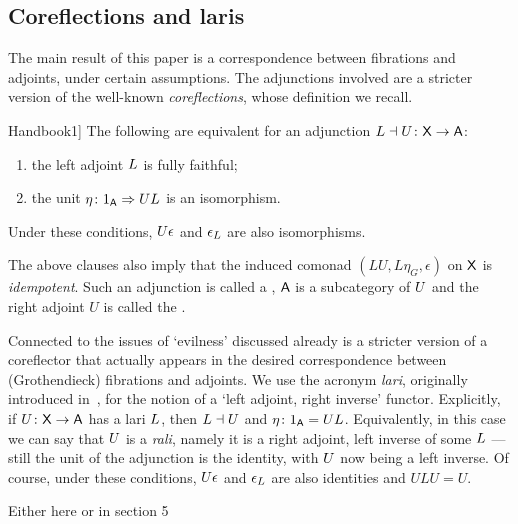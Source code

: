 \documentclass{amsart}
\begin{document}
\subsection*{Coreflections and laris}

The main result of this paper is a correspondence between fibrations and adjoints, under certain assumptions. The adjunctions involved are a stricter version of the well-known \emph{coreflections}, whose definition we recall. %

\begin{prop}[\cite[Prop.~3.4.1]{Handbook1}]\label{prop:coreflection}
The following are equivalent for an adjunction $L\dashv U\colon\mathsf{X}\to\mathsf{A}$:
 \begin{enumerate}
  \item the left adjoint $L$ is fully faithful;
  \item the unit $\eta\colon1_{\mathsf{A}}\Rightarrow UL$ is an isomorphism.
 \end{enumerate}
Under these conditions, $U\epsilon$ and $\epsilon_L$ are also isomorphisms.
\end{prop}

The above clauses also imply that the induced comonad $(LU,L\eta_G,\epsilon)$ on $\mathsf{X}$ is \emph{idempotent}. Such an adjunction is called a , $\mathsf{A}$ is a  subcategory of $U$ and the right adjoint $U$ is called the .

Connected to the issues of `evilness' discussed already is a stricter version of a coreflector that actually appears in the desired correspondence between (Gro\-the\-ndi\-eck) fibrations and adjoints.
We use the acronym \emph{lari}, originally introduced in~\cite{Grayfibredandcofibred}, for the notion of a `left adjoint, right inverse' functor. Explicitly, if $U\colon\mathsf{X}\to\mathsf{A}$ has a lari $L$, then $L\dashv U$ and $\eta\colon1_{\mathsf{A}}=UL$. Equivalently, in this case we can say that $U$ is a \emph{rali}, namely it is a right adjoint, left inverse of some $L$ --- still the unit of the adjunction is the identity, with $U$ now being a left inverse. Of course, under these conditions, $U\epsilon$ and $\epsilon_L$ are also identities and $ULU=U$.

{\chris Either here or in section 5}
\end{document}
